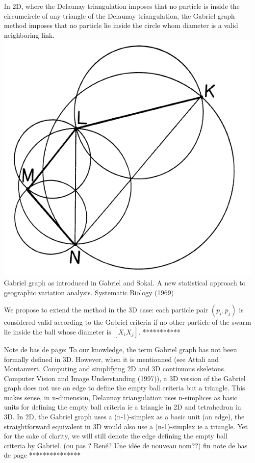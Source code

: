 In 2D, where the Delaunay triangulation imposes that no particle is inside the circumcircle of any triangle of the Delaunay triangulation, the Gabriel graph method imposes that no particle lie inside the circle whom diameter is a valid neighboring link.
\includegraphics{../../images/MECAGEN/spatial_neighb/gabriel.png}Gabriel graph as introduced in Gabriel and Sokal. A new statistical approach to geographic variation analysis. Systematic Biology (1969)

We propose to extend the method in the 3D case: each particle pair $(p_i, p_j)$ is considered valid according to the Gabriel criteria if no other particle of the swarm lie inside the ball whose diameter is $\left [ X_i X_j \right ] $.  *********** 

 Note de bas de page:  To our knowledge, the term Gabriel graph has not been formally defined in 3D. However, when it is mentionned (see Attali and Montanvert. Computing and simplifying 2D and 3D continuous skeletons. Computer Vision and Image Understanding (1997)), a 3D version of the Gabriel graph does not use an edge to define the empty ball criteria but a triangle. This makes sense, in n-dimension, Delaunay triangulation uses n-simplices as basic units for defining the empty ball criteria ie a triangle in 2D and tetrahedron in 3D. In 2D, the Gabriel graph uses a (n-1)-simplex as a basic unit (an edge), the straightforward equivalent in 3D would also use a (n-1)-simplex ie a triangle. Yet for the sake of clarity, we will still denote the edge defining the empty ball criteria by Gabriel. (ou pas ? René? Une idée de nouveau nom??) fin note de bas de page ***************   

